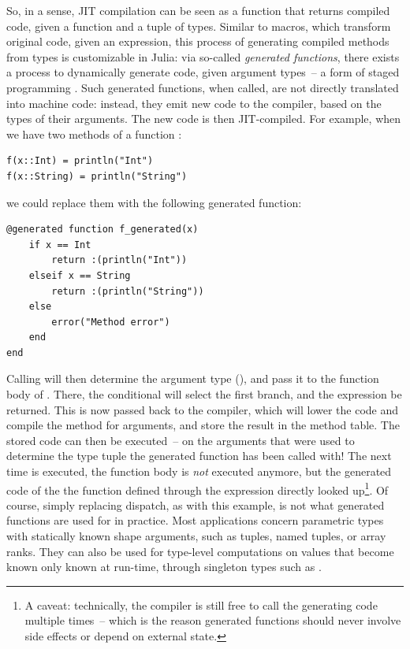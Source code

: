 So, in a sense, JIT compilation can be seen as a function that returns compiled code, given a
function and a tuple of types.  Similar to macros, which transform original code, given an
expression, this process of generating compiled methods from types is customizable in Julia: via
so-called \emph{generated functions}, there exists a process to dynamically generate code, given
argument types~-- a form of staged programming
\parencite{rompf2010lightweight,bolewski2015staged}. Such generated functions, when called, are not
directly translated into machine code: instead, they emit new code to the compiler, based on the
types of their arguments.  The new code is then JIT-compiled.  For example, when we have two methods
of a function :
\begin{lstlisting}
f(x::Int) = println("Int")
f(x::String) = println("String")
\end{lstlisting}
we could replace them with the following generated function:
\begin{lstlisting}
@generated function f_generated(x)
    if x == Int
        return :(println("Int"))
    elseif x == String
        return :(println("String"))
    else
        error("Method error")
    end
end
\end{lstlisting}
Calling  will then determine the argument type (), and
pass it to the function body of .  There, the conditional will select the first
branch, and the expression  be returned.  This is now passed back to the
compiler, which will lower the code and compile the method for  arguments, and store the
result in the method table.  The stored code can then be executed~-- on the arguments that were used
to determine the type tuple the generated function has been called with!  The next time
 is executed, the function body is \emph{not} executed anymore, but the generated
code of the the function defined through the expression  directly looked
up\footnote{A caveat: technically, the compiler is still free to call the generating code multiple
  times~-- which is the reason generated functions should never involve side effects or depend on
  external state.}.  Of course, simply replacing dispatch, as with this example, is not what
generated functions are used for in practice.  Most applications concern parametric types with
statically known shape arguments, such as tuples, named tuples, or array ranks.  They can also be
used for type-level computations on values that become known only known at run-time, through
singleton types such as .

